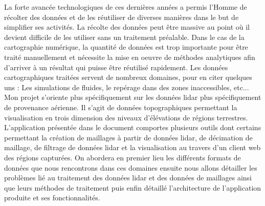 La forte avancée technologiques de ces dernières années a permis l'Homme de récolter des données et de les réutiliser de diverses manières dans le but de simplifier ses activités. 
La récolte des données peut être massive au point où il devient difficile de les utiliser sans un traitement préalable.
Dans le cas de la cartographie numérique, la quantité de données est trop importante pour être traité manuellement et nécessite la mise en oeuvre de méthodes analytiques afin d'arriver à un résultat qui puisse être réutilisé rapidement. 
Les données cartographiques traitées servent de nombreux domaines, pour en citer quelques uns : Les simulations de fluides, le repérage dans des zones inaccessibles, etc... Mon projet s'oriente plus spécifiquement sur les données lidar plus spécifiquement de provenance aérienne. 
Il s'agit de données topographiques permettant la visualisation en trois dimension des niveaux d'élévations de régions terrestres.
L'application présentée dans le document comportes plusieurs outils dont certains permettant la création de maillages à partir de données lidar, de décimation de maillage, de filtrage de données lidar et la visualisation au travers d'un client web des régions capturées. 
On abordera en premier lieu les différents formats de données que nous rencontrons dans ces domaines ensuite nous allons détailler les problèmes lié au traitement des données lidar et des données de maillages ainsi que leurs méthodes de traitement puis enfin détaillé l'architecture de l'application produite et ses fonctionnalités.